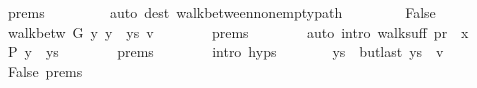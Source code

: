\begin{isabellebody}
\ {\isachardoublequoteopen}{}{\isachardot}{\kern0pt}prems{\isachardoublequoteclose}{\isacharparenleft}{\kern0pt}{}{\isacharcomma}{\kern0pt}\ {}{\isacharparenright}{\kern0pt}\isanewline
\ \ \ \ \ \ \isamarkupfalse%
\ {\isacharparenleft}{\kern0pt}auto\ dest{\isacharcolon}{\kern0pt}\ walk{\isacharunderscore}{\kern0pt}between{\isacharunderscore}{\kern0pt}nonempty{\isacharunderscore}{\kern0pt}path{\isacharparenleft}{\kern0pt}{}{\isacharparenright}{\kern0pt}{\isacharparenright}{\kern0pt}\isanewline
\ \ \isamarkupfalse%
\isanewline
\ \ \ \ \isamarkupfalse%
\ False\isanewline
\ \ \ \ \isamarkupfalse%
\ {\isachardoublequoteopen}walk{\isacharunderscore}{\kern0pt}betw\ G\ y\ {\isacharparenleft}{\kern0pt}y\ {\isacharhash}{\kern0pt}\ ys{\isacharparenright}{\kern0pt}\ v{\isachardoublequoteclose}\isanewline
\ \ \ \ \ \ \isamarkupfalse%
\ {\isachardoublequoteopen}{}{\isachardot}{\kern0pt}prems{\isachardoublequoteclose}{\isacharparenleft}{\kern0pt}{}{\isacharparenright}{\kern0pt}\isanewline
\ \ \ \ \ \ \isamarkupfalse%
\ {\isacharparenleft}{\kern0pt}auto\ intro{\isacharcolon}{\kern0pt}\ walk{\isacharunderscore}{\kern0pt}suff{\isacharbrackleft}{\kern0pt}\ {\isacharquery}{\kern0pt}pr\ {\isacharequal}{\kern0pt}\ {\isachardoublequoteopen}{\isacharbrackleft}{\kern0pt}x{\isacharbrackright}{\kern0pt}{\isachardoublequoteclose}{\isacharbrackright}{\kern0pt}{\isacharparenright}{\kern0pt}\isanewline
\ \ \ \ \isamarkupfalse%
\ {\isachardoublequoteopen}P\ {\isacharparenleft}{\kern0pt}y\ {\isacharhash}{\kern0pt}\ ys{\isacharparenright}{\kern0pt}{\isachardoublequoteclose}\isanewline
\ \ \ \ \ \ \isamarkupfalse%
\ {\isachardoublequoteopen}{}{\isachardot}{\kern0pt}prems{\isachardoublequoteclose}{\isacharparenleft}{\kern0pt}{}{\isacharminus}{\kern0pt}{}{\isacharparenright}{\kern0pt}\isanewline
\ \ \ \ \ \ \isamarkupfalse%
\ {\isacharparenleft}{\kern0pt}intro\ {\isachardoublequoteopen}{}{\isachardot}{\kern0pt}hyps{\isachardoublequoteclose}{\isacharparenright}{\kern0pt}\isanewline
\ \ \ \ \isamarkupfalse%
\ \isamarkupfalse%
\ {\isachardoublequoteopen}ys\ {\isacharequal}{\kern0pt}\ butlast\ ys\ {\isacharat}{\kern0pt}\ {\isacharbrackleft}{\kern0pt}v{\isacharbrackright}{\kern0pt}{\isachardoublequoteclose}\isanewline
\ \ \ \ \ \ \isamarkupfalse%
\ False\ {\isachardoublequoteopen}{}{\isachardot}{\kern0pt}prems{\isachardoublequoteclose}{\isacharparenleft}{\kern0pt}{}{\isacharparenright}{\kern0pt}\isanewline

\end{isabellebody}
